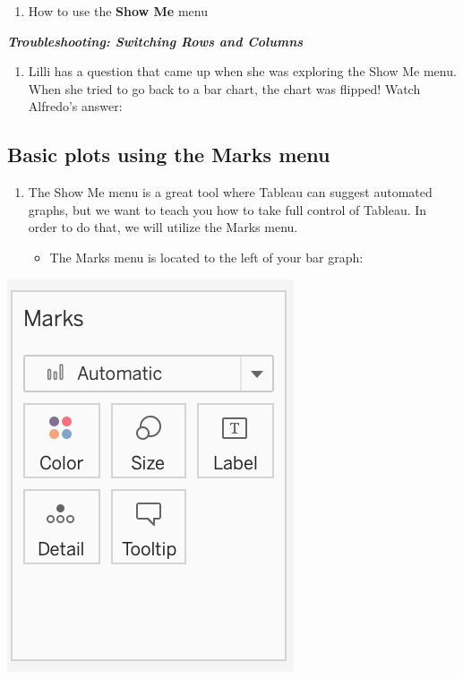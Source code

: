 \documentclass[
]{book}
\providecommand{\tightlist}{%
  \setlength{\itemsep}{0pt}\setlength{\parskip}{0pt}}
\begin{document}
\begin{enumerate}
\def\labelenumi{\arabic{enumi}.}
\setcounter{enumi}{2}
\tightlist
\item
  How to use the \textbf{Show Me} menu
\end{enumerate}

\textbf{\emph{Troubleshooting: Switching Rows and Columns}}

\begin{enumerate}
\def\labelenumi{\arabic{enumi}.}
\tightlist
\item
  Lilli has a question that came up when she was exploring the Show Me menu. When she tried to go back to a bar chart, the chart was flipped! Watch Alfredo's answer:
\end{enumerate}

\hypertarget{basic-plots-using-the-marks-menu}{%
\subsection{Basic plots using the Marks menu}\label{basic-plots-using-the-marks-menu}}

\begin{enumerate}
\def\labelenumi{\arabic{enumi}.}
\tightlist
\item
  The Show Me menu is a great tool where Tableau can suggest automated graphs, but we want to teach you how to take full control of Tableau. In order to do that, we will utilize the Marks menu.

  \begin{itemize}
  \tightlist
  \item
    The Marks menu is located to the left of your bar graph:
  \end{itemize}
\end{enumerate}

\includegraphics{images/M3S2_Marks-Menu.png}
\end{document}
